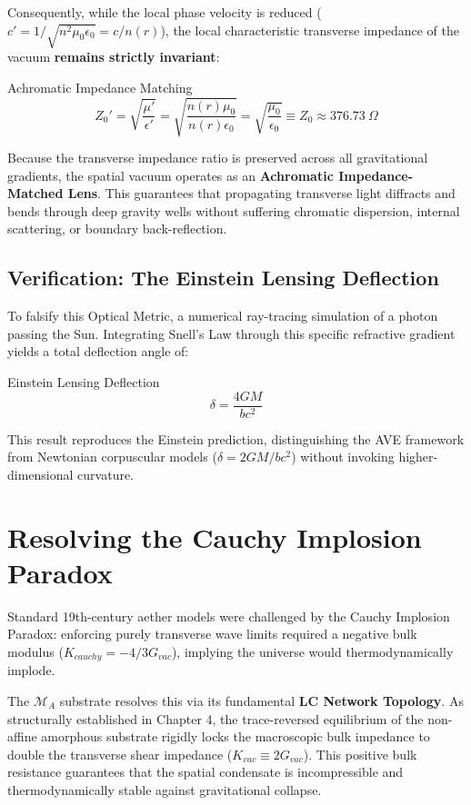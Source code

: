 Consequently, while the local phase velocity is reduced ($c' = 1/\sqrt{n^2\mu_0 \epsilon_0} = c/n(r)$), the local characteristic transverse impedance of the vacuum \textbf{remains strictly invariant}:
\begin{resultbox}{Achromatic Impedance Matching}
\begin{equation}
    Z_0' = \sqrt{\frac{\mu'}{\epsilon'}} = \sqrt{\frac{n(r)\mu_0}{n(r)\epsilon_0}} = \sqrt{\frac{\mu_0}{\epsilon_0}} \equiv Z_0 \approx 376.73\ \Omega
\end{equation}
\end{resultbox}

Because the transverse impedance ratio is preserved across all gravitational gradients, the spatial vacuum operates as an \textbf{Achromatic Impedance-Matched Lens}. This guarantees that propagating transverse light diffracts and bends through deep gravity wells without suffering chromatic dispersion, internal scattering, or boundary back-reflection.


\subsection{Verification: The Einstein Lensing Deflection}
To falsify this Optical Metric, a numerical ray-tracing simulation of a photon passing the Sun. Integrating Snell's Law through this specific refractive gradient yields a total deflection angle of:
\begin{resultbox}{Einstein Lensing Deflection}
\begin{equation}
    \delta = \frac{4GM}{b c^2}
\end{equation}
\end{resultbox}
This result reproduces the Einstein prediction, distinguishing the AVE framework from Newtonian corpuscular models ($\delta = 2GM/bc^2$) without invoking higher-dimensional curvature.

\section{Resolving the Cauchy Implosion Paradox}

Standard 19th-century aether models were challenged by the Cauchy Implosion Paradox:
enforcing purely transverse wave limits required a negative bulk modulus ($K_{cauchy}=
-4/3G_{vac}$), implying the universe would thermodynamically implode.

The $\mathcal{M}_{A}$ substrate resolves this via its fundamental \textbf{LC Network Topology}. As structurally established
in Chapter 4, the trace-reversed equilibrium of the non-affine amorphous substrate rigidly
locks the macroscopic bulk impedance to double the transverse shear impedance ($K_{vac}\equiv2G_{vac}$).
This positive bulk resistance guarantees that the spatial condensate is
incompressible and thermodynamically stable against gravitational collapse.

